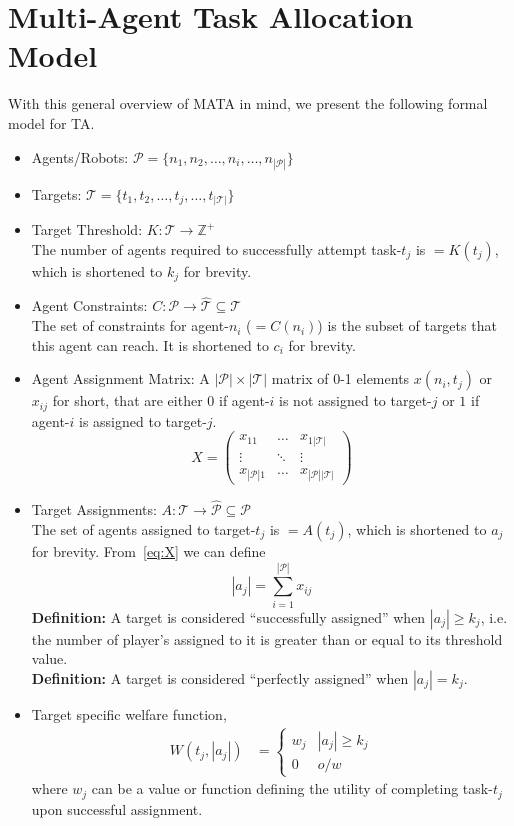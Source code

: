\documentclass[defaultstyle,12pt]{thesis}
\newcommand{\Pl}{\mathcal{P}} %
\newcommand{\Ta}{\mathcal{T}} %
\begin{document}
\section{Multi-Agent Task Allocation Model}
With this general overview of MATA in mind, we present the following formal model for TA.
\begin{itemize}
	\item Agents/Robots: $\Pl = \{n_1, n_2, \ldots, n_i, \ldots,n_{|\Pl|}\}$
	\item Targets: $\Ta = \{t_1, t_2, \ldots, t_j, \ldots,t_{|\Ta|}\}$
	\item Target Threshold: $K:\Ta \to \mathbb{Z}^+$\\
	The number of agents required to successfully attempt task-$t_j$ is $= K(t_j)$, which is shortened to $k_j$ for brevity.
	
	\item Agent Constraints: $C:\Pl \to \hat{\Ta} \subseteq \Ta$\\
	The set of constraints for agent-$n_i$ ($= C(n_i)$) is the subset of targets that this agent can reach. It is shortened to $c_i$ for brevity.
	\item Agent Assignment Matrix: A $|\Pl| \times |\Ta|$ matrix of 0-1 elements $x(n_i, t_j)$ or $x_{ij}$ for short, that are either $0$ if agent-$i$ is not assigned to target-$j$ or $1$ if agent-$i$ is assigned to target-$j$.
	\begin{equation}\label{eq:X}
		X = \left(\begin{array}{ccc}
			x_{11} & \ldots & x_{1|\Ta|}\\
			\vdots & \ddots & \vdots\\
			x_{|\Pl|1} & \ldots & x_{|\Pl||\Ta|}
		\end{array}\right)
	\end{equation}
	\item Target Assignments: $A:\Ta \to \hat{\Pl} \subseteq \Pl$\\
	The set of agents assigned to target-$t_j$ is $= A(t_j)$, which is shortened to $a_j$ for brevity. From~\eqref{eq:X} we can define
\begin{equation}\label{eq:aj}
	|a_j| = \sum\limits_{i = 1}^{|\Pl|} x_{ij}
\end{equation}
	\textbf{Definition:} A target is considered ``successfully assigned'' when $|a_j| \geq k_j$, i.e. the number of player's assigned to it is greater than or equal to its threshold value.\\
	\textbf{Definition:} A target is considered ``perfectly assigned'' when $|a_j| = k_j$.
	\item Target specific welfare function,
\begin{align}\label{eq:wf}
	W(t_j, |a_j|) & = \left\{
	\begin{array}{ll}
		w_j & |a_j| \geq k_j\\
		0 & o/w
	\end{array}\right.
\end{align}
where $w_j$ can be a value or function defining the utility of completing task-$t_j$ upon successful assignment.


\end{itemize}
\end{document}
